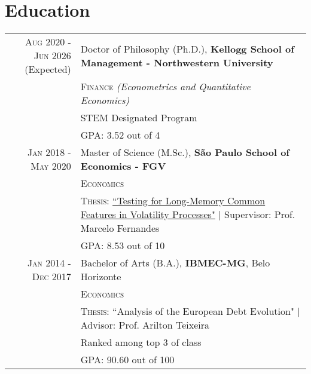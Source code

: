 \documentclass[a4paper,10pt]{article}
\begin{document}

\section{Education}
\begin{tabular}{r|p{10.75cm}}
    \textsc{Aug} 2020 - \parbox[t]{1.5cm}{\centering \textsc{Jun} 2026\\ (Expected)} & Doctor of Philosophy (Ph.D.), \normalsize\textbf{Kellogg School of Management - Northwestern University} \\
    & \textsc{Finance} \textit{(Econometrics and Quantitative Economics)} \\
    & \normalsize \textsc{STEM} Designated Program \\
    & \normalsize \textsc{GPA}: 3.52 out of 4 \\
    \textsc{Jan} 2018 - \textsc{May} 2020 & Master of Science (M.Sc.), \normalsize\textbf{São Paulo School of Economics - FGV} \\
    & \textsc{Economics} \\
    & \normalsize \textsc{Thesis}: \href{http://hdl.handle.net/10438/29188}{``Testing for Long-Memory Common Features in Volatility Processes"} | \small Supervisor: Prof. Marcelo Fernandes \\
    &\normalsize \textsc{GPA}: 8.53 out of 10
    \\
    \textsc{Jan} 2014 - \textsc{Dec} 2017& Bachelor of Arts (B.A.), \normalsize\textbf{IBMEC-MG}, Belo Horizonte \\
    & \textsc{Economics} \\
    & \normalsize \textsc{Thesis}: ``Analysis of the European Debt Evolution" | \small Advisor: Prof. Arilton Teixeira \\
    & \normalsize{Ranked among top 3 of class} \\
    &\normalsize \textsc{GPA}: 90.60 out of 100
\end{tabular}
\end{document}
